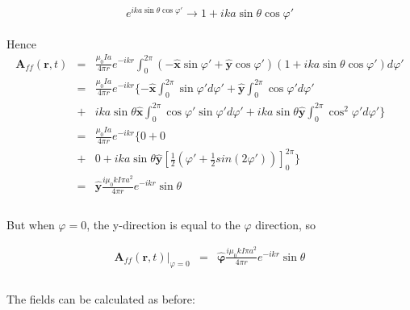 \documentclass[a4paper,10pt]{thesis}
\begin{document}
\begin{equation}\label{taylor}
e^{ik a\sin \theta \cos \varphi' } \rightarrow 1+ik a\sin \theta \cos \varphi'
\end{equation}

\paragraph*{}
Hence
\begin{eqnarray}\label{A_loop_2}
 \mathbf{A}_{ff}(\mathbf{r},t) &=& \frac{\mu_0 I a}{4 \pi r} e^{-ikr} \int_{0}^{2\pi} (-\mathbf{\hat{x}}\sin \varphi ' + \mathbf{\hat{y}} \cos \varphi ') (1+ik a\sin \theta \cos \varphi')   d\varphi' \nonumber \\
&=& \frac{\mu_0 I a}{4 \pi r} e^{-ikr} \{ - \mathbf{\hat{x}} \int_{0}^{2\pi} \sin \varphi ' d\varphi' +  \mathbf{\hat{y}} \int_{0}^{2\pi}  \cos \varphi ' d\varphi' \nonumber \\
&+&  ik a \sin \theta \mathbf{\hat{x}} \int_{0}^{2\pi}  \cos \varphi' \sin \varphi ' d\varphi'+  ik a\sin \theta  \mathbf{\hat{y}} \int_{0}^{2\pi}\cos^2 \varphi'  d\varphi' \} \nonumber \\
&=& \frac{\mu_0 I a}{4 \pi r} e^{-ikr} \{ 0 +  0 \nonumber \\
&+&  0 +  ik a \sin \theta \mathbf{\hat{y}} \left[ \frac{1}{2} \left( \varphi' +\frac{1}{2} sin(2\varphi') \right) \right]_{0}^{2\pi} \} \nonumber \\
&=& \mathbf{\hat{y}} \frac{i \mu_0 k I \pi a^2}{4 \pi r} e^{-ikr} \sin \theta  \nonumber \\
\end{eqnarray}

\paragraph*{}
But when $\varphi = 0$, the y-direction is equal to the $\varphi$ direction, so

\begin{eqnarray}\label{A_loop_2}
 \mathbf{A}_{ff}(\mathbf{r},t)|_{\varphi=0} &=& \mathbf{\hat{\varphi} }\frac{i \mu_0 k I \pi a^2}{4 \pi r} e^{-ikr} \sin \theta  \nonumber \\
\end{eqnarray}

\paragraph*{}
The fields can be calculated as before:
\end{document}
